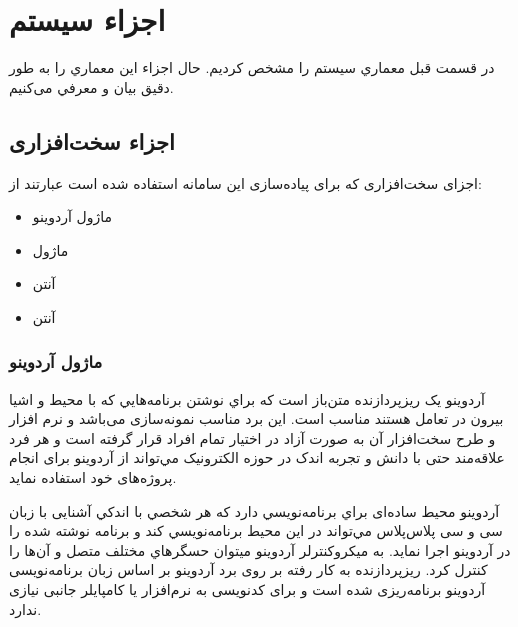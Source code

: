 \section{اجزاء سیستم}
در قسمت قبل معماري سيستم را مشخص كرديم. حال اجزاء اين معماري را به طور دقيق بيان و معرفي می‌کنیم.
\subsection{اجزاء سخت‌افزاری}
اجزای سخت‌افزاری که برای پیاده‌سازی این سامانه استفاده شده است عبارتند از:
\begin{itemize}
	\item
	ماژول آردوینو
	\item
ماژول 
	\item
	آنتن 
	\item
	آنتن 
\end{itemize}
\subsubsection{ماژول آردوینو}
آردوينو يک ريزپردازنده متن‌‌باز است كه براي نوشتن برنامه‌هايي كه با محیط و اشیا بیرون در تعامل هستند مناسب است. این برد مناسب نمونه‌سازی می‌باشد و نرم افزار و طرح سخت‌افزار آن به صورت آزاد در اختیار تمام افراد قرار گرفته است و هر فرد علاقه‌مند حتی با دانش و تجربه اندک در حوزه الکترونیک مي‌تواند از آردوینو برای انجام پروژه‌های خود استفاده نماید.


آردوينو محیط ساده‌ای براي برنامه‌نويسي دارد كه هر شخصي با اندكي آشنایی با زبان سی و سی‌ پلاس‌پلاس مي‌تواند در این محیط برنامه‌نويسي كند و برنامه نوشته شده را در آردوینو اجرا نماید. به ميكروكنترلر آردوينو ميتوان حسگرهاي مختلف متصل و آن‌ها را كنترل كرد. ریزپردازنده به‌ کار رفته بر روی برد آردوینو بر اساس زبان برنامه‌نویسی آردوینو برنامه‌ریزی شده است و برای کدنویسی به نرم‌افزار یا کامپایلر جانبی نیازی ندارد. 


